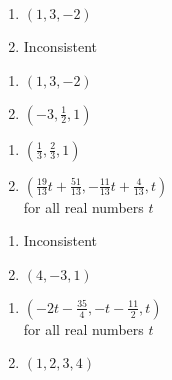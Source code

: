 \documentclass{ximera}
\begin{document}
\begin{multicols}{2}
\begin{enumerate}
\setcounter{enumi}{\value{HW}}

\item $(1,3,-2)$
\item Inconsistent


\setcounter{HW}{\value{enumi}}
\end{enumerate}
\end{multicols}


\begin{multicols}{2}
\begin{enumerate}
\setcounter{enumi}{\value{HW}}


\item $(1,3,-2)$
\item $\left(-3,\frac{1}{2},1\right)$

\setcounter{HW}{\value{enumi}}
\end{enumerate}
\end{multicols}


\begin{multicols}{2}
\begin{enumerate}
\setcounter{enumi}{\value{HW}}



\item  $\left(\frac{1}{3},\frac{2}{3},1\right)$
\item  $\left(\frac{19}{13} t + \frac{51}{13},-\frac{11}{13} t+\frac{4}{13},t\right)$\\
for all real numbers $t$

\setcounter{HW}{\value{enumi}}
\end{enumerate}
\end{multicols}


\begin{multicols}{2}
\begin{enumerate}
\setcounter{enumi}{\value{HW}}

\item Inconsistent
\item $\left(4,-3,1\right)$

\setcounter{HW}{\value{enumi}}
\end{enumerate}
\end{multicols}


\begin{multicols}{2}
\begin{enumerate}
\setcounter{enumi}{\value{HW}}


\item $\left(-2t - \frac{35}{4},-t - \frac{11}{2},t\right)$\\
for all real numbers $t$
\item $(1, 2, 3, 4)$

\setcounter{HW}{\value{enumi}}
\end{enumerate}
\end{multicols}
\end{document}
